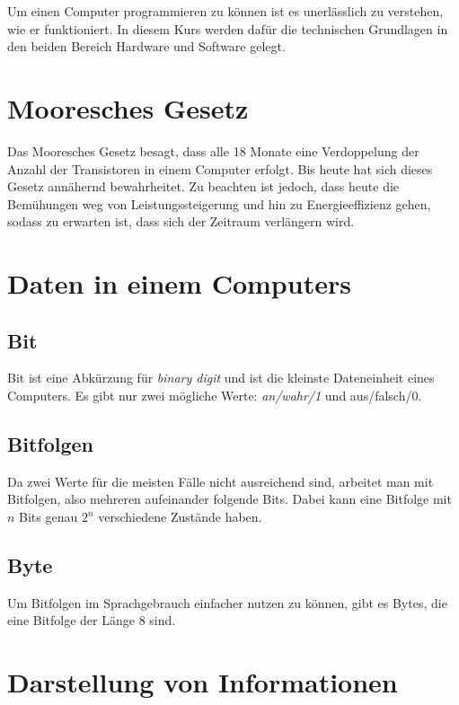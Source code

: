 \documentclass[../main.tex]{subfiles}
\begin{document}
    Um einen Computer programmieren zu können ist es unerlässlich zu verstehen, wie er funktioniert. In diesem Kurs werden dafür die technischen Grundlagen in den beiden Bereich Hardware und Software gelegt.
    \clearpage
    
    \section{Mooresches Gesetz}
        Das Mooresches Gesetz besagt, dass alle 18 Monate eine Verdoppelung der Anzahl der Transistoren in einem Computer erfolgt. Bis heute hat sich dieses Gesetz annähernd bewahrheitet. Zu beachten ist jedoch, dass heute die Bemühungen weg von Leistungssteigerung und hin zu Energieeffizienz gehen, sodass zu erwarten ist, dass sich der Zeitraum verlängern wird.

    \section{Daten in einem Computers}
        \subsection{Bit}
            Bit ist eine Abkürzung für \emph{binary digit} und ist die kleinste Dateneinheit eines Computers. Es gibt nur zwei mögliche Werte: \emph{an/wahr/1} und aus/falsch/0.
            
        \subsection{Bitfolgen}
            Da zwei Werte für die meisten Fälle nicht ausreichend sind, arbeitet man mit Bitfolgen, also mehreren aufeinander folgende Bits. Dabei kann eine Bitfolge mit $n$ Bits genau $2^n$ verschiedene Zustände haben.
        
        \subsection{Byte}
            Um Bitfolgen im Sprachgebrauch einfacher nutzen zu können, gibt es Bytes, die eine Bitfolge der Länge $8$ sind.

    \section{Darstellung von Informationen}
        \label{section:Informatik:TechnischeGrundlagen:DarstellungVonInformationen}
        
\end{document}
